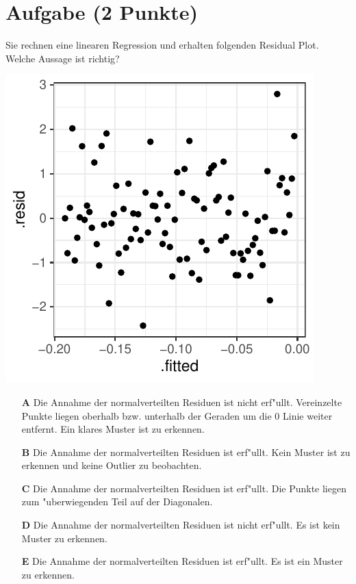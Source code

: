 \documentclass[a4paper, 10pt]{scrartcl}\usepackage[]{graphicx}\usepackage[]{color}
\makeatletter
\def\maxwidth{ %
  \ifdim\Gin@nat@width>\linewidth
    \linewidth
  \else
    \Gin@nat@width
  \fi
}
\makeatother
\begin{document}
\section{Aufgabe \hfill (2 Punkte)}

Sie rechnen eine linearen Regression und erhalten folgenden Residual
Plot. Welche Aussage ist richtig?




{\centering \includegraphics[width=\maxwidth]{img/mc-regression-06-a-1} 

}







\begin{enumerate}
\item [\textbf{A} \msquare] Die Annahme der normalverteilten Residuen ist nicht erf{"u}llt. Vereinzelte Punkte liegen oberhalb bzw. unterhalb der Geraden um die 0 Linie weiter entfernt. Ein klares Muster ist zu erkennen.
\item [\textbf{B} \msquare] Die Annahme der normalverteilten Residuen ist erf{"u}llt. Kein Muster ist zu erkennen und keine Outlier zu beobachten.
\item [\textbf{C} \msquare] Die Annahme der normalverteilten Residuen ist erf{"u}llt. Die Punkte liegen zum {"u}berwiegenden Teil auf der Diagonalen.
\item [\textbf{D} \msquare] Die Annahme der normalverteilten Residuen ist nicht erf{"u}llt. Es ist kein Muster zu erkennen.
\item [\textbf{E} \msquare] Die Annahme der normalverteilten Residuen ist erf{"u}llt. Es ist ein Muster zu erkennen.
\end{enumerate}
\end{document}
